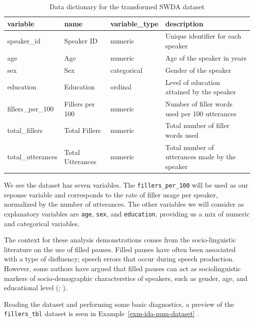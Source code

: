 \documentclass[
  letterpaper,
]{latex/krantz}
\theoremstyle{definition}
\theoremstyle{remark}
\begin{document}
\begin{longtable}[t]{llll}

\caption{\label{tbl-ida-num-data-dict}Data dictionary for the
transformed SWDA dataset}

\tabularnewline

\toprule
variable & name & variable\_type & description\\
\midrule
speaker\_id & Speaker ID & numeric & Unique identifier for each speaker\\
age & Age & numeric & Age of the speaker in years\\
sex & Sex & categorical & Gender of the speaker\\
education & Education & ordinal & Level of education attained by the speaker\\
fillers\_per\_100 & Fillers per 100 & numeric & Number of filler words used per 100 utterances\\
\addlinespace
total\_fillers & Total Fillers & numeric & Total number of filler words used\\
total\_utterances & Total Utterances & numeric & Total number of utterances made by the speaker\\
\bottomrule

\end{longtable}

We see the dataset has seven variables. The \texttt{fillers\_per\_100}
will be used as our reponse variable and corresponds to the rate of
filler usage per speaker, normalized by the number of utterances. The
other variables we will consider as explanatory variables are
\texttt{age}, \texttt{sex}, and \texttt{education}, providing us a mix
of numeric and categorical variables.

The context for these analysis demonstrations comes from the
socio-linguistic literature on the use of filled pauses. Filled pauses
have often been associated with a type of disfluency; speech errors that
occur during speech production. However, some authors have argued that
filled pauses can act as sociolinguistic markers of socio-demographic
characterstics of speakers, such as gender, age, and educational level
(;
).

Reading the dataset and performing some basic diagnostics, a preview of
the \texttt{fillers\_tbl} dataset is seen in
Example~\ref{exm-ida-num-dataset} .
\end{document}
